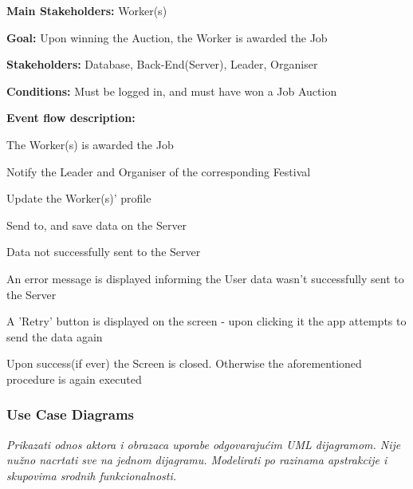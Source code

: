 			\noindent {}
			\begin{packed_item}
				\item \textbf{Main Stakeholders:} Worker(s)
				\item \textbf{Goal:} Upon winning the Auction, the Worker is awarded the Job
				\item \textbf{Stakeholders: } Database, Back-End(Server), Leader, Organiser
				\item \textbf{Conditions: } Must be logged in, and must have won a Job Auction
				\item \textbf{Event flow description: }
				\begin{packed_enum}
					\item The Worker(s) is awarded the Job
					\item Notify the Leader and Organiser of the corresponding Festival
					\item Update the Worker(s)' profile
					\item Send to, and save data on the Server 
				\end{packed_enum}
				
				\begin{packed_item}
					\item[4.a] Data not successfully sent to the Server
					\item[] \begin{packed_enum}
						\item An error message is displayed informing the User data wasn't successfully sent to the Server
						\item A 'Retry' button is displayed on the screen - upon clicking it the app attempts to send the data again
						\item Upon success(if ever) the Screen is closed. Otherwise the aforementioned procedure is again executed
					\end{packed_enum}
				\end{packed_item}
			\end{packed_item}
			
			\subsubsection{Use Case Diagrams}
					
					\textit{Prikazati odnos aktora i obrazaca uporabe odgovarajućim UML dijagramom. Nije nužno nacrtati sve na jednom dijagramu. Modelirati po razinama apstrakcije i skupovima srodnih funkcionalnosti.}
				\eject		
				
